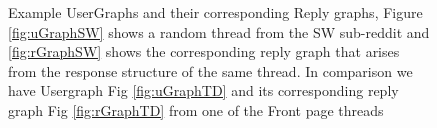 \begin{figure}[!ht]
	\caption{ Example UserGraphs and their corresponding Reply graphs, Figure \ref{fig:uGraphSW} shows a random thread from the SW sub-reddit and \ref{fig:rGraphSW} shows the corresponding reply graph that arises from the response structure of the same thread. In comparison we have Usergraph Fig \ref{fig:uGraphTD} and its corresponding reply graph Fig \ref{fig:rGraphTD} from one of the Front page threads }
	\label{Fig:GraphExamples}
\end{figure}



